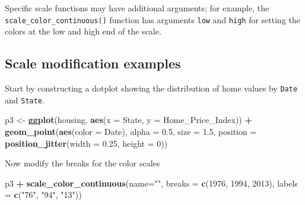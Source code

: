 \documentclass[
]{book}
\newenvironment{Shaded}{\begin{snugshade}}{\end{snugshade}}
\newcommand{\DataTypeTok}[1]{\textcolor[rgb]{0.13,0.29,0.53}{#1}}
\newcommand{\DecValTok}[1]{\textcolor[rgb]{0.00,0.00,0.81}{#1}}
\newcommand{\FloatTok}[1]{\textcolor[rgb]{0.00,0.00,0.81}{#1}}
\newcommand{\KeywordTok}[1]{\textcolor[rgb]{0.13,0.29,0.53}{\textbf{#1}}}
\newcommand{\NormalTok}[1]{#1}
\newcommand{\OperatorTok}[1]{\textcolor[rgb]{0.81,0.36,0.00}{\textbf{#1}}}
\newcommand{\StringTok}[1]{\textcolor[rgb]{0.31,0.60,0.02}{#1}}
\begin{document}
Specific scale functions may have additional arguments; for example, the \texttt{scale\_color\_continuous()} function has arguments \texttt{low} and \texttt{high} for setting the colors at the low and high end of the scale.

\hypertarget{scale-modification-examples}{%
\subsection{Scale modification examples}\label{scale-modification-examples}}

Start by constructing a dotplot showing the distribution of home values by \texttt{Date} and \texttt{State}.

\begin{Shaded}
\begin{Highlighting}[]
\NormalTok{p3 \textless{}{-}}\StringTok{ }\KeywordTok{ggplot}\NormalTok{(housing, }\KeywordTok{aes}\NormalTok{(}\DataTypeTok{x =}\NormalTok{ State, }\DataTypeTok{y =}\NormalTok{ Home\_Price\_Index)) }\OperatorTok{+}\StringTok{ }
\StringTok{    }\KeywordTok{geom\_point}\NormalTok{(}\KeywordTok{aes}\NormalTok{(}\DataTypeTok{color =}\NormalTok{ Date), }\DataTypeTok{alpha =} \FloatTok{0.5}\NormalTok{, }\DataTypeTok{size =} \FloatTok{1.5}\NormalTok{,}
               \DataTypeTok{position =} \KeywordTok{position\_jitter}\NormalTok{(}\DataTypeTok{width =} \FloatTok{0.25}\NormalTok{, }\DataTypeTok{height =} \DecValTok{0}\NormalTok{))}
\end{Highlighting}
\end{Shaded}

Now modify the breaks for the color scales

\begin{Shaded}
\begin{Highlighting}[]
\NormalTok{p3 }\OperatorTok{+}\StringTok{ }
\StringTok{  }\KeywordTok{scale\_color\_continuous}\NormalTok{(}\DataTypeTok{name=}\StringTok{""}\NormalTok{,}
                         \DataTypeTok{breaks =} \KeywordTok{c}\NormalTok{(}\DecValTok{1976}\NormalTok{, }\DecValTok{1994}\NormalTok{, }\DecValTok{2013}\NormalTok{),}
                         \DataTypeTok{labels =} \KeywordTok{c}\NormalTok{(}\StringTok{"\textquotesingle{}76"}\NormalTok{, }\StringTok{"\textquotesingle{}94"}\NormalTok{, }\StringTok{"\textquotesingle{}13"}\NormalTok{))}
\end{Highlighting}
\end{Shaded}
\end{document}
